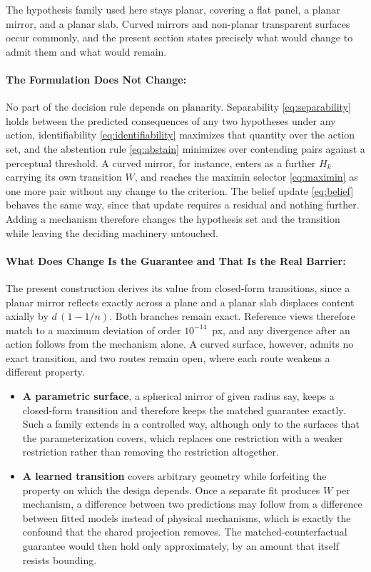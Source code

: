 \documentclass{article} %
\theoremstyle{defstyle}
\theoremstyle{plain}
\begin{document}
The hypothesis family used here stays planar, covering a flat panel, a planar mirror, and a
planar slab. Curved mirrors and non-planar transparent surfaces occur commonly, and the
present section states precisely what would change to admit them and what would remain.

\paragraph{The Formulation Does Not Change:}
No part of the decision rule depends on planarity. Separability \eqref{eq:separability} holds
between the predicted consequences of any two hypotheses under any action, identifiability
\eqref{eq:identifiability} maximizes that quantity over the action set, and the abstention rule
\eqref{eq:abstain} minimizes over contending pairs against a perceptual threshold. A curved
mirror, for instance, enters as a further $H_k$ carrying its own transition $W$, and reaches
the maximin selector \eqref{eq:maximin} as one more pair without any change to the criterion.
The belief update \eqref{eq:belief} behaves the same way, since that update requires a residual
and nothing further. Adding a mechanism therefore changes the hypothesis set and the transition
while leaving the deciding machinery untouched.

\paragraph{What Does Change Is the Guarantee and That Is the Real Barrier:}
The present construction derives its value from closed-form transitions, since a planar mirror
reflects exactly across a plane and a planar slab displaces content axially by $d\,(1 - 1/n)$.
Both branches remain exact. Reference views therefore match to a maximum deviation of order
$10^{-14}$~px, and any divergence after an action follows from the mechanism alone. A curved
surface, however, admits no exact transition, and two routes remain open, where each route
weakens a different property.

\begin{itemize}
\item \textbf{A parametric surface}, a spherical mirror of given radius say,
keeps a closed-form transition and therefore keeps the matched guarantee exactly. Such a family
extends in a controlled way, although only to the surfaces that the parameterization covers,
which replaces one restriction with a weaker restriction rather than removing the restriction
altogether.
\item \textbf{A learned transition} covers arbitrary geometry while forfeiting the property
on which the design depends. Once a separate fit produces $W$ per mechanism, a difference
between two predictions may follow from a difference between fitted models instead of physical
mechanisms, which is exactly the confound that the shared projection removes. The
matched-counterfactual guarantee would then hold only approximately, by an amount that itself
resists bounding.
\end{itemize}
\end{document}
